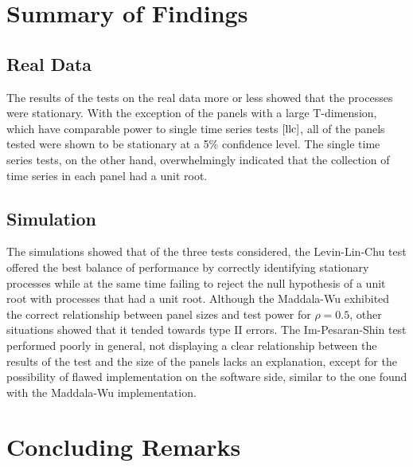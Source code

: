 \section{Summary of Findings}

\subsection{Real Data}

The results of the tests on the real data more or less showed that the processes were stationary. With the exception of the panels with a large T-dimension, which have comparable power to single time series tests $\cite{llc}$, all of the panels tested were shown to be stationary at a 5\% confidence level. The single time series tests, on the other hand, overwhelmingly indicated that the collection of time series in each panel had a unit root.


\subsection{Simulation}

The simulations showed that of the three tests considered, the Levin-Lin-Chu test offered the best balance of performance by correctly identifying stationary processes while at the same time failing to reject the null hypothesis of a unit root with processes that had a unit root. Although the Maddala-Wu exhibited the correct relationship between panel sizes and test power for $\rho = 0.5$, other situations showed that it tended towards type II errors. The Im-Pesaran-Shin test performed poorly in general, not displaying a clear relationship between the results of the test and the size of the panels lacks an explanation, except for the possibility of flawed implementation on the software side, similar to the one found with the Maddala-Wu implementation.

\section{Concluding Remarks}

